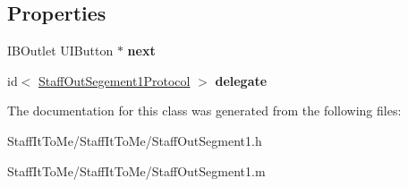 \subsection*{\-Properties}
\begin{DoxyCompactItemize}
\item 
\hypertarget{interface_staff_out_segment1_a0b7cf3acd8dfbfe1542f72149a144dc3}{
\-I\-B\-Outlet \-U\-I\-Button $\ast$ {\bfseries next}}
\label{interface_staff_out_segment1_a0b7cf3acd8dfbfe1542f72149a144dc3}

\item 
\hypertarget{interface_staff_out_segment1_a47799e3d65b9eaf20c96c23a7a990f35}{
id$<$ \hyperlink{protocol_staff_out_segement1_protocol-p}{\-Staff\-Out\-Segement1\-Protocol} $>$ {\bfseries delegate}}
\label{interface_staff_out_segment1_a47799e3d65b9eaf20c96c23a7a990f35}

\end{DoxyCompactItemize}


\-The documentation for this class was generated from the following files\-:\begin{DoxyCompactItemize}
\item 
\-Staff\-It\-To\-Me/\-Staff\-It\-To\-Me/\-Staff\-Out\-Segment1.\-h\item 
\-Staff\-It\-To\-Me/\-Staff\-It\-To\-Me/\-Staff\-Out\-Segment1.\-m\end{DoxyCompactItemize}
